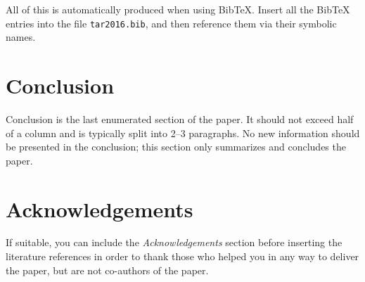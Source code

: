 \documentclass[10pt, a4paper]{article}
\begin{document}
All of this is automatically produced when using BibTeX. Insert all the BibTeX entries into the file \texttt{tar2016.bib}, and then reference them via their symbolic names.

\section{Conclusion}

Conclusion is the last enumerated section of the paper. It should not exceed half of a column and is typically split into 2--3 paragraphs. No new information should be presented in the conclusion; this section only summarizes and concludes the paper.

\section*{Acknowledgements}

If suitable, you can include the \textit{Acknowledgements} section before inserting the literature references  in order to thank those who helped you in any way to deliver the paper, but are not co-authors of the paper.



\end{document}

